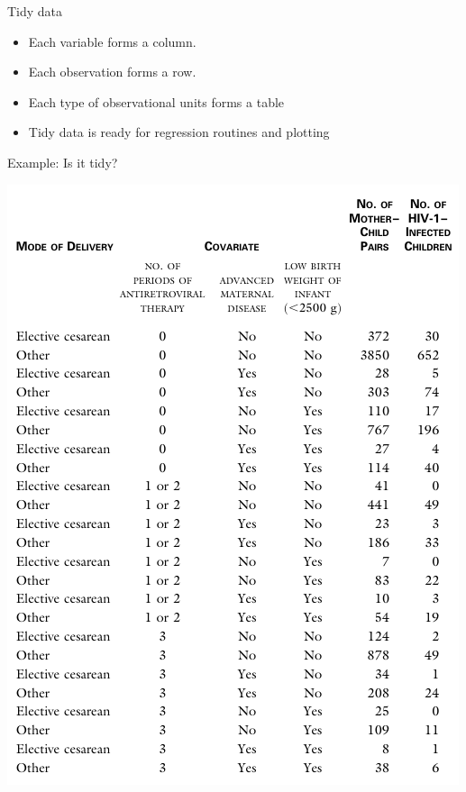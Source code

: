 \documentclass[10pt]{beamer}\usepackage[]{graphicx}\usepackage[]{color}
\begin{document}
\begin{frame}{Tidy data}
	
	\begin{itemize}
		\setlength\itemsep{.51em}
		\item Each variable forms a column.
		\item Each observation forms a row.
		\item Each type of observational units forms a table
		\item Tidy data is ready for regression routines and plotting
	\end{itemize}
	
	
	
\end{frame}




\begin{frame}[fragile]{Example: Is it tidy?}
	
	\centering
	\includegraphics[scale=0.8]{hivtable.pdf}
	
	
\end{frame}
\end{document}
